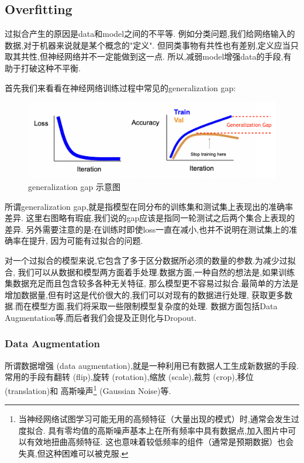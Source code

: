 \subsection{Overfitting}

过拟合产生的原因是data和model之间的不平等.
例如分类问题,我们给网络输入的数据,对于机器来说就是某个概念的"定义".
但同类事物有共性也有差别,定义应当只取其共性,但神经网络并不一定能做到这一点.
所以,减弱model增强data的手段,有助于打破这种不平衡.

首先我们来看看在神经网络训练过程中常见的generalization gap:
\begin{figure}[htbp]
	\centering
	\includegraphics[scale=0.65]{figures/generalgap.png}
	\caption{generalization gap 示意图}
\end{figure}

所谓generalization gap,就是指模型在同分布的训练集和测试集上表现出的准确率差异.
这里右图略有瑕疵,我们说的gap应该是指同一轮测试之后两个集合上表现的差异.
另外需要注意的是:在训练时即使loss一直在减小,也并不说明在测试集上的准确率在提升,
因为可能有过拟合的问题.

对一个过拟合的模型来说,它包含了多于区分数据所必须的数量的参数.为减少过拟合,
我们可以从数据和模型两方面着手处理.数据方面,一种自然的想法是,如果训练集数据充足而且包含较多各种无关特征,
那么模型更不容易过拟合.最简单的方法是增加数据量,但有时这是代价很大的,我们可以对现有的数据进行处理,
获取更多数据.而在模型方面,我们将采取一些限制模型复杂度的处理.
数据方面包括Data Augmentation等,而后者我们会提及正则化与Dropout.

\subsubsection{Data Augmentation}

所谓数据增强 (data augmentation),就是一种利用已有数据人工生成新数据的手段.
常用的手段有翻转 (flip),旋转 (rotation),缩放 (scale),裁剪 (crop),移位 (translation)和
高斯噪声\footnote{当神经网络试图学习可能无用的高频特征（大量出现的模式）时,通常会发生过度拟合.
具有零均值的高斯噪声基本上在所有频率中具有数据点,加入图片中可以有效地扭曲高频特征.
这也意味着较低频率的组件（通常是预期数据）也会失真,但这种困难可以被克服.} (Gaussian Noise)等.

